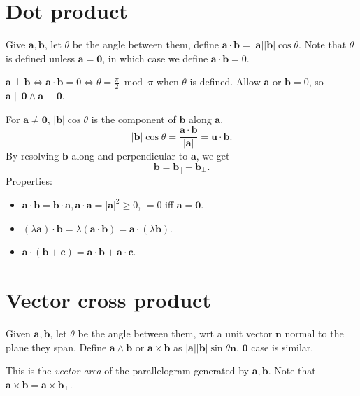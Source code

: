 \documentclass[10pt]{article}
\def\ge{\geqslant}
\begin{document}
    \section{Dot product}
    \begin{definition}
        Give $ \mathbf{a}, \mathbf{b} $, let $ \theta $ be the angle between them, define $ \mathbf{a}\cdot\mathbf{b}=|\mathbf{a}||\mathbf{b}|\cos \theta $. Note that $ \theta $ is defined unless $ \mathbf{a}=\mathbf{0} $, in which case we define $ \mathbf{a}\cdot \mathbf{b}=0 $.

        $ \mathbf{a}\perp\mathbf{b} \Leftrightarrow \mathbf{a}\cdot \mathbf{b}=0 \Leftrightarrow \theta=\frac{\pi}{2}\bmod \pi $ when $ \theta $ is defined. Allow $ \mathbf{a} $ or $ \mathbf{b}=0 $, so $ \mathbf{a} \parallel \mathbf{0} \land \mathbf{a} \perp \mathbf{0} $.
    \end{definition}
    For $ \mathbf{a}\neq \mathbf{0} $, $ |\mathbf{b}|\cos \theta $ is the component of $ \mathbf{b} $ along $ \mathbf{a} $.
    \[
        \left| \mathbf{b} \right| \cos \theta = \frac{\mathbf{a}\cdot \mathbf{b}}{|\mathbf{a}|}=\mathbf{u}\cdot \mathbf{b}
    .\]
    By resolving $ \mathbf{b} $ along and perpendicular to $ \mathbf{a} $, we get 
    \[
        \mathbf{b} = \mathbf{b}_{\parallel} + \mathbf{b}_{\perp }
    .\]
    Properties:
    \begin{itemize}
        \item $ \mathbf{a}\cdot \mathbf{b}=\mathbf{b}\cdot \mathbf{a}, \mathbf{a}\cdot \mathbf{a}=|\mathbf{a}|^2\ge 0 $, $ =0 $ iff $ \mathbf{a}=\mathbf{0} $.
        \item $ (\lambda \mathbf{a})\cdot \mathbf{b}=\lambda (\mathbf{a}\cdot \mathbf{b})=\mathbf{a}\cdot (\lambda \mathbf{b}) $.
        \item $ \mathbf{a}\cdot (\mathbf{b}+\mathbf{c})=\mathbf{a}\cdot \mathbf{b}+\mathbf{a}\cdot \mathbf{c} $.
    \end{itemize}
    \section{Vector cross product}
    \begin{definition}
        Given $ \mathbf{a},\mathbf{b} $, let $ \theta $ be the angle between them, wrt a unit vector $ \mathbf{n} $ normal to the plane they span. Define $ \mathbf{a} \wedge \mathbf{b} $ or $ \mathbf{a} \times \mathbf{b} $ as $ |\mathbf{a}||\mathbf{b}|\sin \theta \mathbf{n} $. $ \mathbf{0} $ case is similar.
    \end{definition}
    This is the \textit{vector area} of the parallelogram generated by $ \mathbf{a}, \mathbf{b} $. Note that $ \mathbf{a} \times \mathbf{b} = \mathbf{a} \times \mathbf{b}_{\perp } $.
\end{document}
